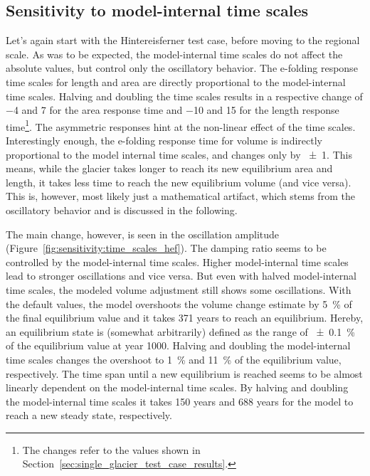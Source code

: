     \subsection{Sensitivity to model-internal time scales} %
    \label{sec:sensitivity_to_model_internal_time_scales_results}
      Let's again start with the Hintereisferner test case, before moving to the regional scale. As was to be expected, the model-internal time scales do not affect the absolute values, but control only the oscillatory behavior. The e-folding response time scales for length and area are directly proportional to the model-internal time scales. Halving and doubling the time scales results in a respective change of \SI{-4}{\year} and \SI{+7}{\year} for the area response time and \SI{-10}{\year} and \SI{+15}{\year} for the length response time\footnote{The changes refer to the values shown in Section~\ref{sec:single_glacier_test_case_results}.}. The asymmetric responses hint at the non-linear effect of the time scales. Interestingly enough, the e-folding response time for volume is indirectly proportional to the model internal time scales, and changes only by \SI{\pm1}{\year}. This means, while the glacier takes longer to reach its new equilibrium area and length, it takes less time to reach the new equilibrium volume (and vice versa). This is, however, most likely just a mathematical artifact, which stems from the oscillatory behavior and is discussed in the following.

      The main change, however, is seen in the oscillation amplitude (Figure~\ref{fig:sensitivity:time_scales_hef}). The damping ratio seems to be controlled by the model-internal time scales. Higher model-internal time scales lead to stronger oscillations and vice versa. But even with halved model-internal time scales, the modeled volume adjustment still shows some oscillations. With the default values, the \vas{} model overshoots the volume change estimate by \SI{5}{\percent} of the final equilibrium value and it takes 371 years to reach an equilibrium. Hereby, an equilibrium state is (somewhat arbitrarily) defined as the range of \SI{\pm0.1}{\percent} of the equilibrium value at year 1000. Halving and doubling the model-internal time scales changes the overshoot to \SI{1}{\percent} and \SI{11}{\percent} of the equilibrium value, respectively. The time span until a new equilibrium is reached seems to be almost linearly dependent on the model-internal time scales. By halving and doubling the model-internal time scales it takes 150 years and 688 years for the model to reach a new steady state, respectively.

